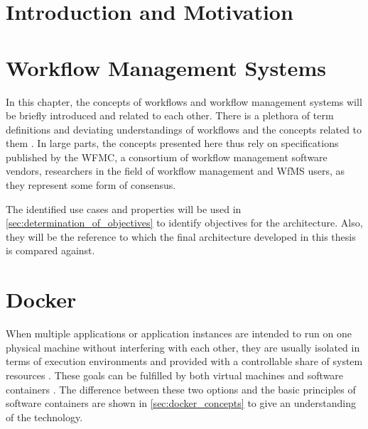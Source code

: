 \documentclass[language=english,noinputenc]{wiwwuwordrprt}
\begin{document}
  \newlength{\customtabwidth}
  \setlength{\customtabwidth}{\textwidth}
  \addtolength{\customtabwidth}{-\tabcolsep}
  \captionsetup{justification=centering}

  \EinfTitelseite

  \tableofcontents
  \listoffigures
  \listoftables

  

  \clearpage
  


  \chapter{Introduction and Motivation} %
    \label{cha:introduction_and_motivation}
    

  \chapter{Workflow Management Systems} %
    \label{cha:workflow_management_systems}
    In this chapter, the concepts of workflows and workflow management systems will be briefly introduced and related to each other.
    There is a plethora of term definitions and deviating understandings of workflows and the concepts related to them \cite{Casati1999Specification}.
    In large parts, the concepts presented here thus rely on specifications published by the \ac{WFMC}, a consortium of workflow management software vendors, researchers in the field of workflow management and \ac{WfMS} users, as they represent some form of consensus.

    The identified use cases and properties will be used in \ref{sec:determination_of_objectives} to identify objectives for the architecture. Also, they will be the reference to which the final architecture developed in this thesis is compared against.
    

  \chapter{Docker} %
    \label{cha:docker}

    When multiple applications or application instances are intended to run on one physical machine without interfering with each other, they are usually isolated in terms of execution environments and provided with a controllable share of system resources \cite{Felter2014Updated}. These goals can be fulfilled by both virtual machines and software containers \cite{Ruiz2015Performance}. The difference between these two options and the basic principles of software containers are shown in \ref{sec:docker_concepts} to give an understanding of the technology.
\end{document}
